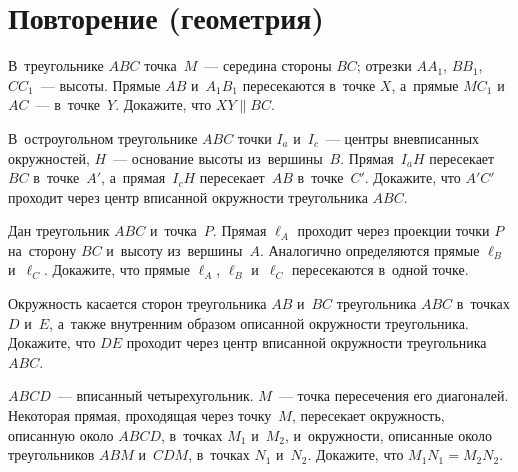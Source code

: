 
\section*{Повторение (геометрия)}


\begin{problems}

\item
В~треугольнике $ABC$ точка~$M$~--- середина стороны $BC$;
отрезки $A A_1$, $B B_1$, $C C_1$~--- высоты.
Прямые $AB$ и~$A_1 B_1$ пересекаются в~точке $X$, а~прямые $M C_1$ и~$AC$~---
в~точке~$Y$.
Докажите, что $XY \parallel BC$.

\item
В~остроугольном треугольнике $ABC$ точки $I_a$ и~$I_c$~--- центры вневписанных
окружностей, $H$~--- основание высоты из~вершины~$B$.
Прямая~$I_a H$ пересекает~$BC$ в~точке~$A'$, а~прямая~$I_c H$ пересекает~$AB$
в~точке~$C'$.
Докажите, что $A'C'$ проходит через центр вписанной окружности
треугольника $ABC$.

\item
Дан треугольник $ABC$ и~точка~$P$.
Прямая $\ell_A$ проходит через проекции точки $P$ на~сторону $BC$ и~высоту
из~вершины~$A$.
Аналогично определяются прямые $\ell_B$ и~$\ell_C$.
Докажите, что прямые $\ell_A$, $\ell_B$ и~$\ell_C$ пересекаются в~одной точке.

\item
Окружность касается сторон треугольника $AB$ и~$BC$ треугольника $ABC$
в~точках $D$ и~$E$, а~также внутренним образом описанной окружности
треугольника.
Докажите, что $DE$ проходит через центр вписанной окружности
треугольника $ABC$.

\item
$ABCD$~--- вписанный четырехугольник.
$M$~--- точка пересечения его диагоналей.
Некоторая прямая, проходящая через точку~$M$, пересекает окружность, описанную
около $ABCD$, в~точках $M_1$ и~$M_2$, и~окружности, описанные около
треугольников $ABM$ и~$CDM$, в~точках $N_1$ и~$N_2$.
Докажите, что $M_1 N_1 = M_2 N_2$.

\end{problems}

